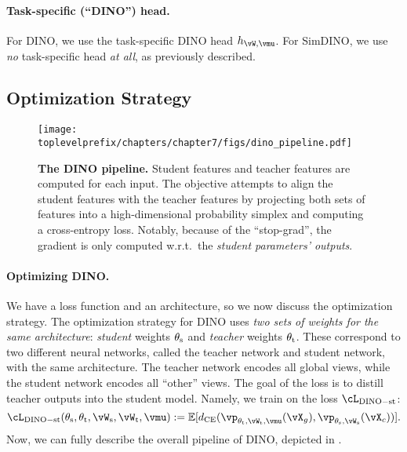 \documentclass[../../book-main.tex]{subfiles}
\begin{document}
\paragraph{Task-specific (``DINO'') head.} For DINO, we use the task-specific DINO head \(h_{\vW, \vmu}\). For SimDINO, we use \textit{no} task-specific head \textit{at all}, as previously described.

\subsection{Optimization Strategy}\label{sub:contrastive_learning_optimization}

\begin{figure}
    \centering 
    \texttt{[image: \\toplevelprefix/chapters/chapter7/figs/dino\_pipeline.pdf]}
    \caption{\small \textbf{The DINO pipeline.} Student features and teacher features are computed for each input. The objective attempts to align the student features with the teacher features by projecting both sets of features into a high-dimensional probability simplex and computing a cross-entropy loss. Notably, because of the ``stop-grad'', the gradient is only computed w.r.t.~the \textit{student parameters' outputs}.}
    \label{fig:dino_pipeline}
\end{figure}

\paragraph{Optimizing DINO.} We have a loss function and an architecture, so we now discuss the optimization strategy. The optimization strategy for DINO uses \textit{two sets of weights for the same architecture}: \textit{student} weights \(\theta_{\mathrm{s}}\) and \textit{teacher} weights \(\theta_{\mathrm{t}}\). These correspond to two different neural networks, called the teacher network and student network, with the same architecture. The teacher network encodes all global views, while the student network encodes all ``other'' views. The goal of the loss is to distill teacher outputs into the student model. Namely, we train on the loss \(\cL_{\dino{}-\student\teacher}\):
\begin{equation}\label{eq:dino_loss_teacherstudent}
    \cL_{\dino{}-\student\teacher}(\theta_{\student}, \theta_{\teacher}, \vW_{\student}, \vW_{\teacher}, \vmu) := \Ex[d_{\CE}(\vp_{\theta_{\teacher}, \vW_{\teacher}, \vmu}(\vX_{g}), \vp_{\theta_{\student}, \vW_{\student}}(\vX_{c}))].
\end{equation}
Now, we can fully describe the overall pipeline of DINO, depicted in .
\end{document}
